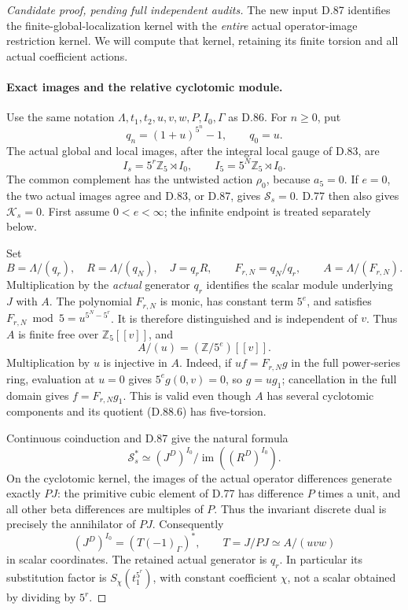 \begin{proof}[Candidate proof, pending full independent audits]
The new input D.87 identifies the finite-global-localization
kernel with the \emph{entire} actual operator-image restriction
kernel. We will compute that kernel, retaining its finite
torsion and all actual coefficient actions.

\paragraph{Exact images and the relative cyclotomic module.}
Use the same notation \(\Lambda,t_1,t_2,u,v,w,P,I_0,\Gamma\)
as D.86. For \(n\ge0\), put
\[
                     q_n=(1+u)^{5^n}-1,
                     \qquad q_0=u.
\]
The actual global and local images, after the integral local
gauge of D.83, are
\[
 I_s=5^r\mathbb Z_5\rtimes I_0,
       \qquad I_5=5^N\mathbb Z_5\rtimes I_0.           \tag{D.88.4}
\]
The common complement has the untwisted action \(\rho_0\),
because \(a_5=0\). If \(e=0\), the two actual images agree
and D.83, or D.87, gives \(\mathcal S_s=0\). D.77 then
also gives \(\mathcal K_s=0\). First assume \(0<e<\infty\);
the infinite endpoint is treated separately below.

Set
\[
 B=\Lambda/(q_r),\quad R=\Lambda/(q_N),\quad J=q_rR,
 \qquad F_{r,N}=q_N/q_r,
 \qquad A=\Lambda/(F_{r,N}).                           \tag{D.88.5}
\]
Multiplication by the \emph{actual} generator \(q_r\)
identifies the scalar module underlying \(J\) with \(A\).
The polynomial \(F_{r,N}\) is monic, has constant term
\(5^e\), and satisfies
\(F_{r,N}\bmod5=u^{5^N-5^r}\). It is therefore
distinguished and is independent of \(v\). Thus \(A\) is
finite free over \(\mathbb Z_5[[v]]\), and
\[
                     A/(u)=(\mathbb Z/5^e)[[v]].       \tag{D.88.6}
\]
Multiplication by \(u\) is injective in \(A\). Indeed,
if \(uf=F_{r,N}g\) in the full power-series ring, evaluation
at \(u=0\) gives \(5^e g(0,v)=0\), so \(g=ug_1\);
cancellation in the full domain gives \(f=F_{r,N}g_1\).
This is valid even though \(A\) has several cyclotomic
components and its quotient (D.88.6) has five-torsion.

Continuous coinduction and D.87 give the natural formula
\[
 \mathcal S_s^*\simeq
       (J^D)^{I_0}/\operatorname{im}((R^D)^{I_0}).       \tag{D.88.7}
\]
On the cyclotomic kernel, the images of the actual operator
differences generate exactly \(PJ\): the primitive cubic
element of D.77 has difference \(P\) times a unit, and all
other beta differences are multiples of \(P\). Thus the
invariant discrete dual is precisely the annihilator of
\(PJ\). Consequently
\[
 (J^D)^{I_0}=(T(-1)_\Gamma)^*,\qquad
             T=J/PJ\simeq A/(uvw)                    \tag{D.88.8}
\]
in scalar coordinates. The retained actual generator is
\(q_r\). In particular its substitution factor is
\(S_\chi(t_1^{5^r})\), with constant coefficient \(\chi\),
not a scalar obtained by dividing by \(5^r\).


\end{proof}
